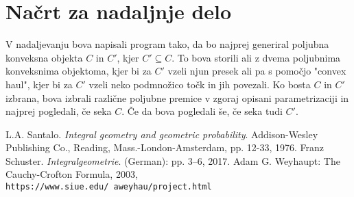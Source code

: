 \documentclass[a4paper,12pt]{article}
\begin{document}
\section{Načrt za nadaljnje delo}
V nadaljevanju bova napisali program tako, da bo najprej generiral poljubna konveksna objekta $C$ in $C'$, kjer $C' \subseteq C$. To bova storili ali z dvema poljubnima konveksnima objektoma, kjer bi za $C'$ vzeli njun presek ali pa s pomočjo "convex haul", kjer bi za $C'$ vzeli neko podmnožico točk in jih povezali. 
Ko bosta $C$ in $C'$ izbrana, bova izbrali različne poljubne premice v zgoraj opisani parametrizaciji in najprej pogledali, če seka $C$. Če da bova pogledali še, če seka tudi $C'$.
\begin{thebibliography}{9}
 L.A. Santalo. \textit{Integral geometry and geometric probability}. Addison-Wesley Publishing Co., Reading, Mass.-London-Amsterdam, pp. 12-33, 1976.
 Franz Schuster. \textit{Integralgeometrie}. (German): pp. 3–6, 2017.
 Adam G. Weyhaupt: The Cauchy-Crofton Formula, 2003,\\\texttt{https://www.siue.edu/~aweyhau/project.html}
\end{thebibliography}
\end{document}
